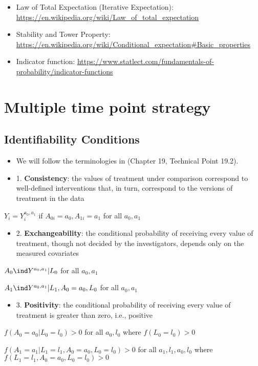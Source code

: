 \documentclass[dvipdfmx,10pt]{article}
\begin{document}
\begin{itemize}
\item Law of Total Expectation (Iterative Expectation): \url{https://en.wikipedia.org/wiki/Law\_of\_total\_expectation}
\item Stability and Tower Property: \url{https://en.wikipedia.org/wiki/Conditional\_expectation\#Basic\_properties}
\item Indicator function: \url{https://www.statlect.com/fundamentals-of-probability/indicator-functions}
\end{itemize}

\section{Multiple time point strategy}
\label{sec:orge332edf}
\subsection{Identifiability Conditions}
\label{sec:orge3e8aad}
\begin{itemize}
\item We will follow the terminologies in \cite{hernanCausalInference2019} (Chapter 19, Technical Point 19.2).
\item 1. \textbf{Consistency}: the values of treatment under comparison correspond to well-defined interventions that, in turn, correspond to the versions of treatment in the data
\end{itemize}
\begin{center}
\(Y_{i} = Y_{i}^{a_{0},a_{1}}\) if \(A_{0i} = a_{0}, A_{1i} = a_{1}\) for all \(a_{0},a_{1}\)
\end{center}
\begin{itemize}
\item 2. \textbf{Exchangeability}: the conditional probability of receiving every value of treatment, though not decided by the investigators, depends only on the measured covariates
\end{itemize}
\begin{center}
\(A_{0} \ind Y^{a_{0},a_{1}} | L_{0}\) for all \(a_{0},a_{1}\)

\(A_{1} \ind Y^{a_{0},a_{1}} | L_{1},A_{0}=a_{0},L_{0}\) for all \(a_{0},a_{1}\)
\end{center}
\begin{itemize}
\item 3. \textbf{Positivity}: the conditional probability of receiving every value of treatment is greater than zero, i.e., positive
\end{itemize}
\begin{center}
\(f(A_{0} = a_{0} | L_{0} = l_{0}) > 0\) for all \(a_{0},l_{0}\) where \(f(L_{0} = l_{0}) > 0\)

\(f(A_{1} = a_{1} | L_{1} = l_{1}, A_{0} = a_{0}, L_{0} = l_{0}) > 0\) for all \(a_{1},l_{1},a_{0},l_{0}\) where \(f(L_{1} = l_{1}, A_{0} = a_{0}, L_{0} = l_{0}) > 0\)
\end{center}
\end{document}
